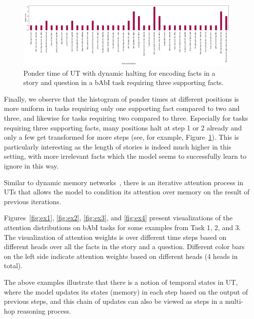 \begin{figure}[t]
 \centering
 \includegraphics[width=\textwidth]{04-part-03/chapter-06/figs_and_tables/fig_task3_example_ponder.png}
 \caption{Ponder time of UT with dynamic halting for encoding facts in a story and question in a bAbI task requiring three supporting facts.}
 \label{fig:act_ponder}
\end{figure}
Finally, we observe that the histogram of ponder times at different positions is more uniform in tasks requiring only one supporting fact compared to two and three, and likewise for tasks requiring two compared to three.  Especially for tasks requiring three supporting facts, many positions halt at step 1 or 2 already and only a few get transformed for more steps (see, for example, Figure~\ref{fig:act_ponder}). This is particularly interesting as the length of stories is indeed much higher in this setting, with more irrelevant facts which the model seems to successfully learn to ignore in this way.

Similar to dynamic memory networks~\citep{kumar2016ask}, there is an iterative attention process in UTs that allows the model to condition its attention over memory on the result of previous iterations. 
%



Figures~\ref{fig:ex1}, \ref{fig:ex2}, \ref{fig:ex3}, and \ref{fig:ex4} present visualizations of the attention distributions on bAbI tasks for some examples from Task 1, 2, and 3. The visualization of attention weights is over different time steps based on different heads over all the facts in the story and a question. Different color bars on the left side indicate attention weights based on different heads (4 heads in total).

The above examples illustrate that there is a notion of temporal states in UT, where the model updates its states (memory) in each step based on the output of previous steps, and this chain of updates can also be viewed as steps in a multi-hop reasoning process.

